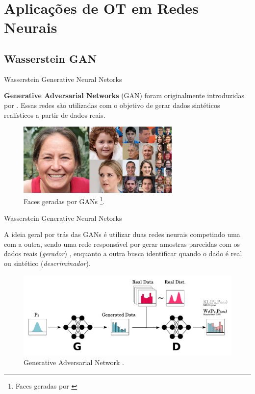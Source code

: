 \documentclass[10pt]{beamer}
\begin{document}
\AtBeginSection{}
\section[Aplicações OT]{Aplicações de OT em Redes Neurais}
\subsection[WGAN]{Wasserstein GAN}
\begin{frame}[fragile]{Wasserstein Generative Neural Netorks}

	\textbf{Generative Adversarial Networks} (GAN)
	foram originalmente introduzidas por \citet{goodfellow2014}.
	Essas redes são utilizadas com o objetivo de gerar
	dados sintéticos realísticos a partir de dados reais.

	\begin{figure}[H]
		\centering
		\includegraphics[width=8cm]{Figures/gans-faces.png}
		\caption{Faces geradas por GANs
			\footnote{Faces geradas por \citet{karras2018}}.}
	\end{figure}

\end{frame}

\begin{frame}[fragile]{Wasserstein Generative Neural Netorks}

	A ideia geral por trás das GANs é utilizar duas redes neurais
	competindo uma com a outra, sendo uma rede responsável por
	gerar amostras parecidas com os dados reais (\textit{gerador}) , enquanto a outra
	busca identificar quando o dado é real ou sintético
	(\textit{descriminador}).

	\begin{figure}[H]
		\begin{center}
			\includegraphics[width=1.0\textwidth]{Figures/wgan.pdf}
		\end{center}
		\caption{Generative Adversarial Network \citep{sales2021optimal}.}
	\end{figure}

\end{frame}
\end{document}
